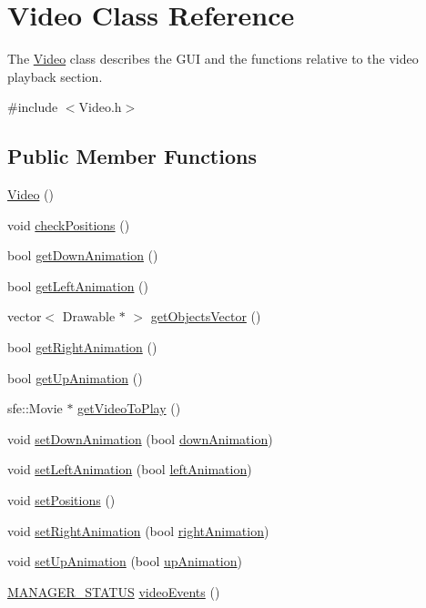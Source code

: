 \hypertarget{classVideo}{}\section{Video Class Reference}
\label{classVideo}


The \hyperlink{classVideo}{Video} class describes the G\+UI and the functions relative to the video playback section.  




{\ttfamily \#include $<$Video.\+h$>$}

\subsection*{Public Member Functions}
\begin{DoxyCompactItemize}
\item 
\hyperlink{classVideo_ab67336c2c5b6227a9635bc7dcd6af543}{Video} ()
\item 
void \hyperlink{classVideo_a9e80e9a88fd5d80aeeda8df0804fa2e8}{check\+Positions} ()
\item 
bool \hyperlink{classVideo_ab93216910bfa303c707d85dcba691a32}{get\+Down\+Animation} ()
\item 
bool \hyperlink{classVideo_af805356652d8f08c41da1df0f3f5854d}{get\+Left\+Animation} ()
\item 
vector$<$ Drawable $\ast$ $>$ \hyperlink{classVideo_aeffa6c8901a81ba7ce15f63ff97dbfa8}{get\+Objects\+Vector} ()
\item 
bool \hyperlink{classVideo_ac31c5b728166d7cf7fe7f58d71dc50b1}{get\+Right\+Animation} ()
\item 
bool \hyperlink{classVideo_a1810b74d077a593c429211a2d374a51f}{get\+Up\+Animation} ()
\item 
sfe\+::\+Movie $\ast$ \hyperlink{classVideo_ab8e3fcb522e1e4be723a3ef05b315cb3}{get\+Video\+To\+Play} ()
\item 
void \hyperlink{classVideo_a3c882e87f594e4c89284f5e5a7093069}{set\+Down\+Animation} (bool \hyperlink{classVideo_aec0e8ade42cb0336539857309f1329ee}{down\+Animation})
\item 
void \hyperlink{classVideo_aed05b84331399a1e2d42dffdc25ca4d6}{set\+Left\+Animation} (bool \hyperlink{classVideo_a9cc3dcc22a6e20b9f1dbc6340386c5d0}{left\+Animation})
\item 
void \hyperlink{classVideo_ad9ec3de5d15bfb5dbaaad3f81157c2ab}{set\+Positions} ()
\item 
void \hyperlink{classVideo_a2c06363b8efa7c22811693cfec9630e6}{set\+Right\+Animation} (bool \hyperlink{classVideo_ab61a504587371180bb6533ed99e1a688}{right\+Animation})
\item 
void \hyperlink{classVideo_a9aea5a522a7ba84ccae1e946f6a6a41b}{set\+Up\+Animation} (bool \hyperlink{classVideo_a997f7ceb635d7897d2eed00cf6faaf19}{up\+Animation})
\item 
\hyperlink{Global_8h_a94049c48a0d77b80bca0fcb5b1281516}{M\+A\+N\+A\+G\+E\+R\+\_\+\+S\+T\+A\+T\+US} \hyperlink{classVideo_a732cb55c0a7f677ddf20ea0c39690ace}{video\+Events} ()
\end{DoxyCompactItemize}
